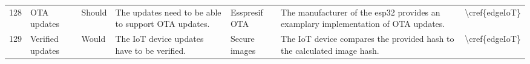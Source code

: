 \begin{longtable}{l p{1.5cm} l p{4cm} p{2cm} p{4cm} l }
128 & OTA updates                             & Should         & The updates need to be able to support OTA updates.                                                                                                                                        & Esspresif OTA            & The manufacturer of the esp32 provides an examplary implementation of OTA updates.                                                                                                                                             & \textbackslash{}cref\{edgeIoT\}    \\
129 & Verified updates                        & Would          & The IoT device updates have to be verified.                                                                                                                                                & Secure images            & The IoT device compares the provided hash to the calculated image hash.                                                                                                                                                        & \textbackslash{}cref\{edgeIoT\}   
\end{longtable}
\clearpage